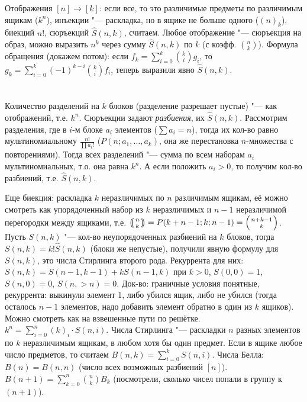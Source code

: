 Отображения $[n] \to [k]$: если все, то это различимые предметы по различимым ящикам ($k^n$),
инъекции "--- раскладка, но в ящике не больше одного ($(n)_k$), биекций $n!$, сюръекций $\hat S(n, k)$, считаем.
Любое отображение "--- сюръекция на образ, можно выразить $n^k$ через сумму $\hat S(n, k)$ по $k$
(с коэфф. $\binom{n}{k}$).
Формула обращения (докажем потом): если $f_k=\sum_{i=0}^k \binom{k}{i} g_i$, то $g_k=\sum_{i=0}^k (-1)^{k-i} \binom{k}{i} f_i$,
теперь выразили явно $\hat S(n, k)$.

\section{} %
Количество разделений на $k$ блоков (разделение разрешает пустые) "--- как отображений, т.е. $k^n$.
Сюръекции задают \textit{разбиения}, их $\hat S(n, k)$.
Рассмотрим разделения, где в $i$-м блоке $a_i$ элементов ($\sum a_i=n$),
тогда их кол-во равно мультиномиальному $\frac{n!}{\prod a_i!}$ ($P(n; a_1, \dots, a_k)$,
она же перестановка $n$-множества с повторениями).
Тогда всех разделений "--- сумма по всем наборам $a_i$ мультиномиальных, т.о. она равна $k^n$.
А если положить $a_i>0$, то получим кол-во разбиений, т.е. $\hat S(n, k)$.

Еще биекция: раскладка $k$ неразличимых по $n$ различимым ящикам, её можно смотреть
как упорядоченный набор из $k$ неразличимых и $n-1$ неразличимой перегородки между ящиками,
т.е. $\repbinom{n}{k}=P(k+n-1;k;n-1)=\binom{n+k-1}{k}$.
Пусть $S(n, k)$ "--- кол-во неупорядоченных разбиений на $k$ блоков, тогда $S(n, k)=k!\hat S(n, k)$
(блоки же непустые), получили явную формулу для $S(n, k)$, это числа Стирлинга второго рода.
Рекуррента для них: $S(n, k)=S(n-1, k-1)+kS(n-1, k)$ при $k>0$, $S(0,0)=1$, $S(n,0)=0$,
$S(n, >n)=0$.
Док-во: граничные условия понятные, рекуррента: выкинули элемент 1, либо убился ящик,
либо не убился (тогда осталось $n-1$ элементов, надо добавить элемент обратно в один из $k$ ящиков).
Можно смотреть как на взвешенные пути по решётке.
$k^n=\sum_{i=0}^n (k)_i \cdot S(n, i)$.
Числа Стирлинга "--- раскладки $n$ разных элементов по $k$ неразличимым ящикам, в любом хотя бы один предмет.
Если в ящике любое число предметов, то считаем $B(n, k)=\sum_{i=0}^k S(n, i)$.
Числа Белла: $B(n)=B(n, n)$ (число всех возможных разбиений $[n]$).
$B(n+1)=\sum_{k=0}^n \binom{n}{k} B_k$ (посмотрели, сколько чисел попали в группу к $(n+1)$).
